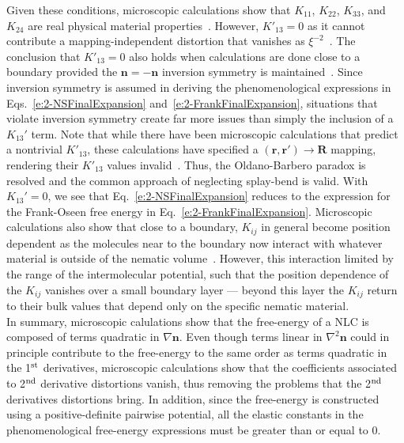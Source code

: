 Given these conditions, microscopic calculations show that $K_{11}$, $K_{22}$, $K_{33}$, and $K_{24}$ are real physical material properties~\cite{RN55}.
However, $K'_{13} = 0$ as it cannot contribute a mapping-independent distortion that vanishes as $\xi^{-2}$~\cite{RN55}.
The conclusion that $K'_{13} = 0$ also holds when calculations are done close to a boundary provided the $\mathbf{n} = -\mathbf{n}$ inversion symmetry is maintained~\cite{RN56}.
Since inversion symmetry is assumed in deriving the phenomenological expressions in Eqs.~\ref{e:2-NSFinalExpansion} and~\ref{e:2-FrankFinalExpansion}, situations that violate inversion symmetry create far more issues than simply the inclusion of a $K_{13}'$ term.
Note that while there have been microscopic calculations that predict a nontrivial $K'_{13}$, these calculations have specified a $(\mathbf{r},\mathbf{r}') \rightarrow \mathbf{R}$ mapping, rendering their $K'_{13}$ values invalid~.
Thus, the Oldano-Barbero paradox is resolved and the common approach of neglecting splay-bend is valid.
With $K_{13}'=0$, we see that Eq.~\ref{e:2-NSFinalExpansion} reduces to the expression for the Frank-Oseen free energy in Eq.~\ref{e:2-FrankFinalExpansion}.
Microscopic calculations also show that close to a boundary, $K_{ij}$ in general become position dependent as the molecules near to the boundary now interact with whatever material is outside of the nematic volume~\cite{RN56,RN57,RN55}.
However, this interaction limited by the range of the intermolecular potential, such that the position dependence of the $K_{ij}$ vanishes over a small boundary layer --- beyond this layer the $K_{ij}$ return to their bulk values that depend only on the specific nematic material.\\


In summary, microscopic calulations show that the free-energy of a NLC is composed of terms quadratic in $\nabla \mathbf{n}$.
Even though terms linear in $\nabla ^2 \mathbf{n}$ could in principle contribute to the free-energy to the same order as terms quadratic in the 1$^\textup{st}$ derivatives, microscopic calculations show that the coefficients associated to 2$^\textup{nd}$ derivative distortions vanish, thus removing the problems that the 2$^\textup{nd}$ derivatives distortions bring.
In addition, since the free-energy is constructed using a positive-definite pairwise potential, all the elastic constants in the phenomenological free-energy expressions must be greater than or equal to 0.


